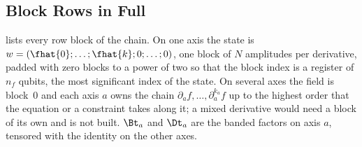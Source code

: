 %

\subsection{Block Rows in Full}
\label{app:descriptor-rows}

 lists every row block of the chain. On one axis the state is $w=(\fhat{0};\dots;\fhat{k};0;\dots;0)$, one block of $N$ amplitudes per derivative, padded with zero blocks to a power of two so that the block index is a register of $n_f$ qubits, the most significant index of the state. On several axes the field is block~$0$ and each axis $a$ owns the chain $\partial_af,\dots,\partial_a^{k_a}f$ up to the highest order that the equation or a constraint takes along it; a mixed derivative would need a block of its own and is not built. $\Bt_a$ and $\Dt_a$ are the banded factors on axis $a$, tensored with the identity on the other axes.

